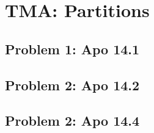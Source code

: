 \section{TMA: Partitions}

\subsection[Problem 1]{Problem 1: Apo 14.1}

\subsection[Problem 2]{Problem 2: Apo 14.2}

\subsection[Problem 2]{Problem 2: Apo 14.4}
